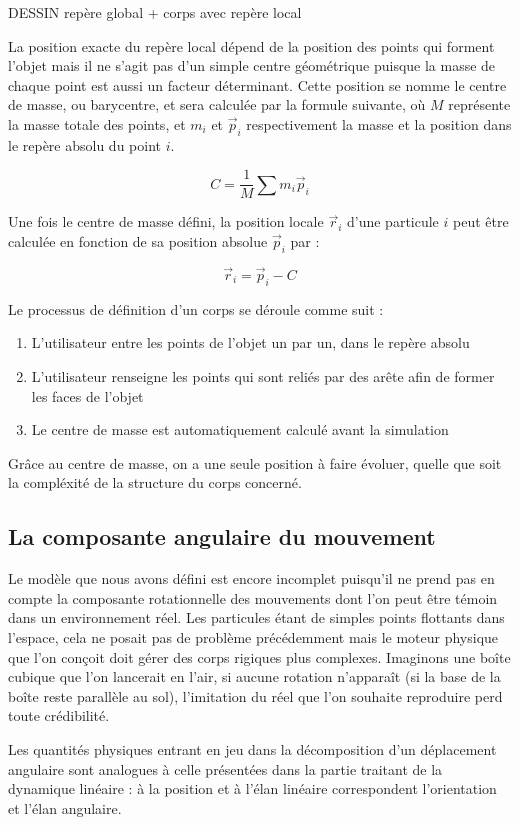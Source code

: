 DESSIN repère global + corps avec repère local

La position exacte du repère local dépend de la position des points qui forment l'objet mais il ne s'agit pas d'un simple centre géométrique puisque la masse de chaque point est aussi un facteur déterminant. Cette position se nomme le centre de masse, ou barycentre, et sera calculée par la formule suivante, o\`u $M$ représente la masse totale des points, et $m_i$ et $\vec{p}_i$ respectivement la masse et la position dans le repère absolu du point $i$.

\[C = \frac{1}{M} \sum m_i \vec{p}_i\]

Une fois le centre de masse défini, la position locale $\vec{r}_i$ d'une particule $i$ peut être calculée en fonction de sa position absolue $\vec{p}_i$ par :

\[\vec{r}_i = \vec{p}_i - C\]

Le processus de définition d'un corps se déroule comme suit :
\begin{enumerate}
  \item{L'utilisateur entre les points de l'objet un par un, dans le repère absolu}
  \item{L'utilisateur renseigne les points qui sont reliés par des arête afin de former les faces de l'objet}
  \item{Le centre de masse est automatiquement calculé avant la simulation}
\end{enumerate}

Grâce au centre de masse, on a une seule position à faire évoluer, quelle que soit la compléxité de la structure du corps concerné.

\subsection{La composante angulaire du mouvement}

Le modèle que nous avons défini est encore incomplet puisqu'il ne prend pas en compte la composante rotationnelle des mouvements dont l'on peut être témoin dans un environnement réel. Les particules étant de simples points flottants dans l'espace, cela ne posait pas de problème précédemment mais le moteur physique que l'on conçoit doit gérer des corps rigiques plus complexes. Imaginons une boîte cubique que l'on lancerait en l'air, si aucune rotation n'apparaît (si la base de la boîte reste parallèle au sol), l'imitation du réel que l'on souhaite reproduire perd toute crédibilité.

Les quantités physiques entrant en jeu dans la décomposition d'un déplacement angulaire sont analogues à celle présentées dans la partie traitant de la dynamique linéaire : à la position et à l'élan linéaire correspondent l'orientation et l'élan angulaire.

